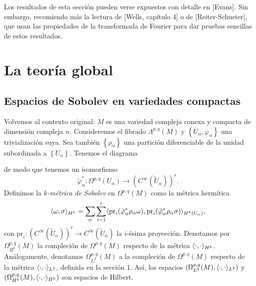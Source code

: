 \documentclass[12pt,a4paper]{article}
\theoremstyle{definition} \newtheorem{defn}[thm]{Definición}
\theoremstyle{definition} \newtheorem{ejemplo}[thm]{Ejemplo}
\theoremstyle{definition} \newtheorem{ejercicio}[thm]{Ejercicio}
\theoremstyle{remark} \newtheorem*{obs}{Observación}
\DeclarePairedDelimiter\esc{\langle}{\rangle}
\newcommand{\CC}{\mathbb{C}}
\newcommand{\pr}{\mathrm{pr}}
\begin{document}
  Los resultados de esta sección pueden verse expuestos con detalle en [Evans]. Sin embargo, recomiendo más la lectura de [Wells, capítulo 4] o de [Reiter-Schuster], que usan las propiedades de la transformada de Fourier para dar pruebas sencillas de estos resultados.

  \section{La teoría global}
  \subsection{Espacios de Sobolev en variedades compactas}
  Volvemos al contexto original: $M$ es una variedad compleja conexa y compacta de dimensión compleja $n$. Consideremos el fibrado $\Lambda^{p,q}(M)$ y $\left\{ U_\alpha, \varphi_\alpha \right\}$ una trivialización suya. Sea también $\left\{ \rho_\alpha \right\}$ una partición diferenciable de la unidad subordinada a $\left\{ U_\alpha \right\}$. Tenemos el diagrama
  \begin{center}
   \end{center}
   de modo que tenemos un isomorfismo
   \begin{equation*}
     \tilde{\varphi}_\alpha^*:\Omega^{p,q}(U_\alpha) \rightarrow (C^\infty(\tilde{U}_{\alpha}))^r.
   \end{equation*}
   Definimos la \emph{$k$-métrica de Sobolev} en $\Omega^{p,q}(M)$ como la métrica hermítica
   \begin{equation*}
     \esc{\omega,\sigma}_{H^k}=\sum_\alpha \sum_{i=1}^r \esc{\pr_i (\tilde{\varphi}_\alpha^* \rho_\alpha \omega),\pr_i(\tilde{\varphi}_\alpha^* \rho_\alpha \sigma)}_{H^k(U_\alpha)},
   \end{equation*}
   con $\pr_i: (C^\infty(\tilde{U}_\alpha))^r \rightarrow C^\infty(\tilde{U}_\alpha)$ la $i$-ésima proyección. 
   Denotamos por $\Omega^{p,q}_{H^k}(M)$ la compleción de $\Omega^{p,q}(M)$ respecto de la métrica $\esc{\cdot,\cdot}_{H^k}$. Análogamente, denotamos $\Omega^{p,q}_{L^2}(M)$ a la compleción de $\Omega^{p,q}(M)$ respecto de la métrica $\esc{\cdot,\cdot}_{L^2}$, definida en la sección 1. Así, los espacios $(\Omega^{p,q}_{L^2}(M),\esc{\cdot,\cdot}_{L^2})$ y $(\Omega^{p,q}_{H^k}(M),\esc{\cdot,\cdot}_{H^k})$ son espacios de Hilbert.
   
\end{document}
